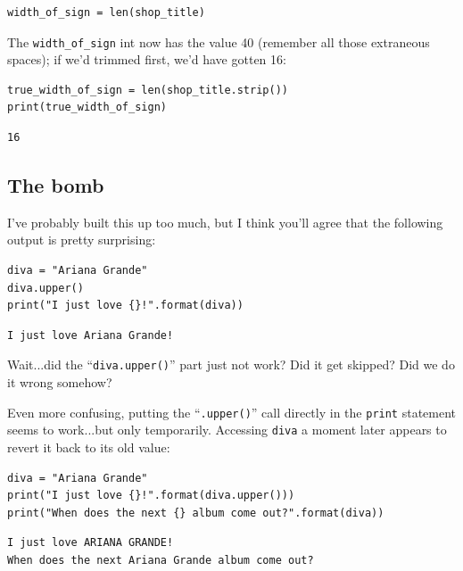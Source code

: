 \begin{Verbatim}[fontsize=\small,samepage=true,frame=single,framesep=3mm]
width_of_sign = len(shop_title)
\end{Verbatim}

The \texttt{width\_of\_sign} int now has the value 40 (remember all those
extraneous spaces); if we'd trimmed first, we'd have gotten 16:

\begin{Verbatim}[fontsize=\small,samepage=true,frame=single,framesep=3mm]
true_width_of_sign = len(shop_title.strip())
print(true_width_of_sign)
\end{Verbatim}

\begin{Verbatim}[fontsize=\small,samepage=true,frame=leftline,framesep=5mm,framerule=1mm]
16
\end{Verbatim}


\subsection{The bomb}

I've probably built this up too much, but I think you'll agree that the
following output is pretty surprising:

\begin{Verbatim}[fontsize=\small,samepage=true,frame=single,framesep=3mm]
diva = "Ariana Grande"
diva.upper()
print("I just love {}!".format(diva))
\end{Verbatim}

\begin{Verbatim}[fontsize=\small,samepage=true,frame=leftline,framesep=5mm,framerule=1mm]
I just love Ariana Grande!
\end{Verbatim}

Wait...did the ``\texttt{diva.upper()}'' part just not work? Did it get
skipped? Did we do it wrong somehow?

Even more confusing, putting the ``\texttt{.upper()}'' call directly in the
\texttt{print} statement seems to work...but only temporarily. Accessing
\texttt{diva} a moment later appears to revert it back to its old value:

\begin{Verbatim}[fontsize=\small,samepage=true,frame=single,framesep=3mm]
diva = "Ariana Grande"
print("I just love {}!".format(diva.upper()))
print("When does the next {} album come out?".format(diva))
\end{Verbatim}

\begin{Verbatim}[fontsize=\small,samepage=true,frame=leftline,framesep=5mm,framerule=1mm]
I just love ARIANA GRANDE!
When does the next Ariana Grande album come out?
\end{Verbatim}


